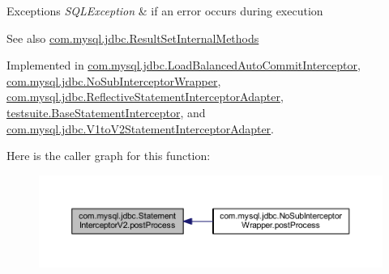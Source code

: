 \begin{DoxyExceptions}{Exceptions}
{\em S\+Q\+L\+Exception} & if an error occurs during execution\\
\hline
\end{DoxyExceptions}
\begin{DoxySeeAlso}{See also}
\mbox{\hyperlink{interfacecom_1_1mysql_1_1jdbc_1_1_result_set_internal_methods}{com.\+mysql.\+jdbc.\+Result\+Set\+Internal\+Methods}} 
\end{DoxySeeAlso}


Implemented in \mbox{\hyperlink{classcom_1_1mysql_1_1jdbc_1_1_load_balanced_auto_commit_interceptor_a54b925109880e6e84eb16b36f608ecd3}{com.\+mysql.\+jdbc.\+Load\+Balanced\+Auto\+Commit\+Interceptor}}, \mbox{\hyperlink{classcom_1_1mysql_1_1jdbc_1_1_no_sub_interceptor_wrapper_ad422f02c34900ee0adb87481762f09a7}{com.\+mysql.\+jdbc.\+No\+Sub\+Interceptor\+Wrapper}}, \mbox{\hyperlink{classcom_1_1mysql_1_1jdbc_1_1_reflective_statement_interceptor_adapter_a2b91745fad9110e1f8f33fc4ce4b6be1}{com.\+mysql.\+jdbc.\+Reflective\+Statement\+Interceptor\+Adapter}}, \mbox{\hyperlink{classtestsuite_1_1_base_statement_interceptor_a00ff902755e287c1a983e8d840ca32d5}{testsuite.\+Base\+Statement\+Interceptor}}, and \mbox{\hyperlink{classcom_1_1mysql_1_1jdbc_1_1_v1to_v2_statement_interceptor_adapter_ab1a3f9ab0d2156eb2fbe442e39354ece}{com.\+mysql.\+jdbc.\+V1to\+V2\+Statement\+Interceptor\+Adapter}}.

Here is the caller graph for this function\+:
\nopagebreak
\begin{figure}[H]
\begin{center}
\leavevmode
\includegraphics[width=350pt]{interfacecom_1_1mysql_1_1jdbc_1_1_statement_interceptor_v2_a6dadce27d32c6beaa303d46515307320_icgraph}
\end{center}
\end{figure}
\mbox{\label{interfacecom_1_1mysql_1_1jdbc_1_1_statement_interceptor_v2_abe4a0e52fc3e4cc9b458dd8eaeef82ff}} 
